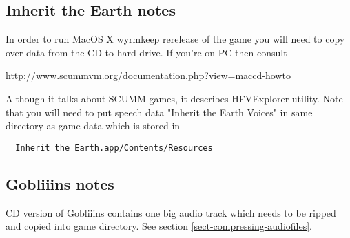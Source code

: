 \subsection{Inherit the Earth notes}
In order to run MacOS X wyrmkeep rerelease of the game you will need to copy
over data from the CD to hard drive. If you're on PC then consult

\url{http://www.scummvm.org/documentation.php?view=maccd-howto}

Although it talks about SCUMM games, it describes HFVExplorer utility. Note
that you will need to put speech data "Inherit the Earth Voices" in same
directory as game data which is stored in

\begin{verbatim}
  Inherit the Earth.app/Contents/Resources
\end{verbatim}

\subsection{Gobliiins notes}
CD version of Gobliiins contains one big audio track which needs to be ripped
and copied into game directory. See section \ref{sect-compressing-audiofiles}.

